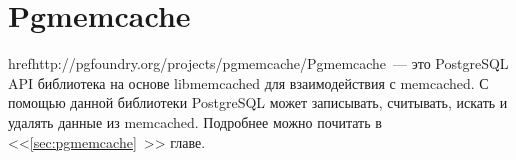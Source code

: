 \section{Pgmemcache}

href{http://pgfoundry.org/projects/pgmemcache/}{Pgmemcache}~--- это PostgreSQL API библиотека на основе libmemcached для взаимодействия с memcached. С помощью данной библиотеки PostgreSQL может записывать, считывать, искать и удалять данные из memcached. Подробнее можно почитать в <<\ref{sec:pgmemcache}~>> главе.